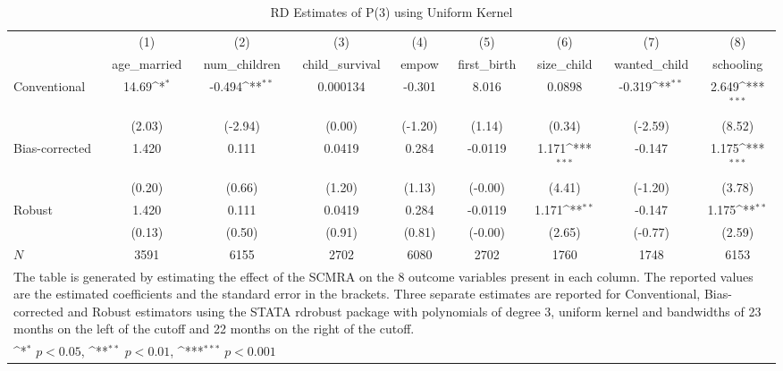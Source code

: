 \begin{table}[htbp]\centering
\def\sym#1{\ifmmode^{#1}\else\(^{#1}\)\fi}
\caption{RD Estimates of P(3) using Uniform Kernel}
\begin{tabular}{l*{8}{c}}
\toprule
            &\multicolumn{1}{c}{(1)}&\multicolumn{1}{c}{(2)}&\multicolumn{1}{c}{(3)}&\multicolumn{1}{c}{(4)}&\multicolumn{1}{c}{(5)}&\multicolumn{1}{c}{(6)}&\multicolumn{1}{c}{(7)}&\multicolumn{1}{c}{(8)}\\
            &\multicolumn{1}{c}{age\_married}&\multicolumn{1}{c}{num\_children}&\multicolumn{1}{c}{child\_survival}&\multicolumn{1}{c}{empow}&\multicolumn{1}{c}{first\_birth}&\multicolumn{1}{c}{size\_child}&\multicolumn{1}{c}{wanted\_child}&\multicolumn{1}{c}{schooling}\\
\midrule
Conventional&       14.69\sym{*}  &      -0.494\sym{**} &    0.000134         &      -0.301         &       8.016         &      0.0898         &      -0.319\sym{**} &       2.649\sym{***}\\
            &      (2.03)         &     (-2.94)         &      (0.00)         &     (-1.20)         &      (1.14)         &      (0.34)         &     (-2.59)         &      (8.52)         \\
\addlinespace
Bias-corrected&       1.420         &       0.111         &      0.0419         &       0.284         &     -0.0119         &       1.171\sym{***}&      -0.147         &       1.175\sym{***}\\
            &      (0.20)         &      (0.66)         &      (1.20)         &      (1.13)         &     (-0.00)         &      (4.41)         &     (-1.20)         &      (3.78)         \\
\addlinespace
Robust      &       1.420         &       0.111         &      0.0419         &       0.284         &     -0.0119         &       1.171\sym{**} &      -0.147         &       1.175\sym{**} \\
            &      (0.13)         &      (0.50)         &      (0.91)         &      (0.81)         &     (-0.00)         &      (2.65)         &     (-0.77)         &      (2.59)         \\
\midrule
\(N\)       &        3591         &        6155         &        2702         &        6080         &        2702         &        1760         &        1748         &        6153         \\
\bottomrule
\multicolumn{9}{l}{\footnotesize The table is generated by estimating the effect of the SCMRA on the 8 outcome variables present in each column. The reported values are the estimated coefficients and the standard error in the brackets. Three separate estimates are reported for Conventional, Bias-corrected and Robust estimators using the STATA rdrobust package with polynomials of degree 3, uniform kernel and bandwidths of 23 months on the left of the cutoff and 22 months on the right of the cutoff.}\\
\multicolumn{9}{l}{\footnotesize \sym{*} \(p<0.05\), \sym{**} \(p<0.01\), \sym{***} \(p<0.001\)}\\
\end{tabular}
\end{table}
